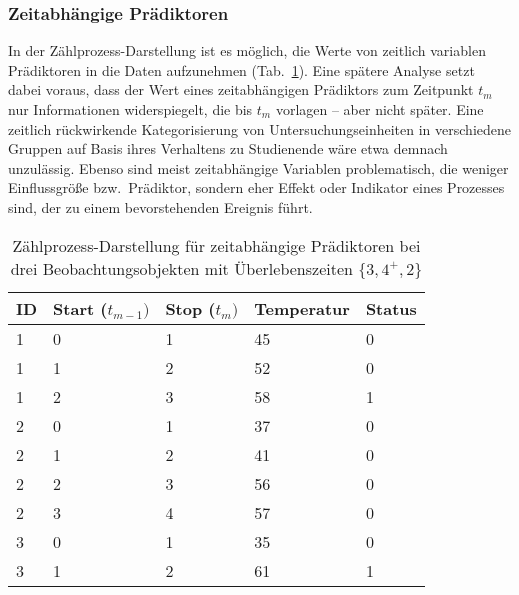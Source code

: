 \subsubsection{Zeitabhängige Prädiktoren}

In der Zählprozess-Darstellung ist es möglich, die Werte von zeitlich variablen Prädiktoren in die Daten aufzunehmen (Tab.\ \ref{tab:survTimeDep}). Eine spätere Analyse setzt dabei voraus, dass der Wert eines zeitabhängigen Prädiktors zum Zeitpunkt $t_{m}$ nur Informationen widerspiegelt, die bis $t_{m}$ vorlagen -- aber nicht später. Eine zeitlich rückwirkende Kategorisierung von Untersuchungseinheiten in verschiedene Gruppen auf Basis ihres Verhaltens zu Studienende wäre etwa demnach unzulässig. Ebenso sind meist zeitabhängige Variablen problematisch, die weniger Einflussgröße bzw.\ Prädiktor, sondern eher Effekt oder Indikator eines Prozesses sind, der zu einem bevorstehenden Ereignis führt.

\begin{table}[ht]
\centering
\caption{Zählprozess-Darstellung für zeitabhängige Prädiktoren bei drei Beobachtungsobjekten mit Überlebenszeiten $\{3, 4^{+}, 2\}$}
\label{tab:survTimeDep}
\begin{tabular}{lllll}
\hline
ID & \sffamily Start ($t_{m-1})$ & \sffamily Stop ($t_{m})$ & \sffamily Temperatur & \sffamily Status\\\hline\hline
 1 & 0       & 1       & 45                   & 0 \\
 1 & 1       & 2       & 52                   & 0 \\
 1 & 2       & 3       & 58                   & 1 \\
 2 & 0       & 1       & 37                   & 0 \\
 2 & 1       & 2       & 41                   & 0 \\
 2 & 2       & 3       & 56                   & 0 \\
 2 & 3       & 4       & 57                   & 0 \\
 3 & 0       & 1       & 35                   & 0 \\
 3 & 1       & 2       & 61                   & 1 \\\hline
\end{tabular}
\end{table}

